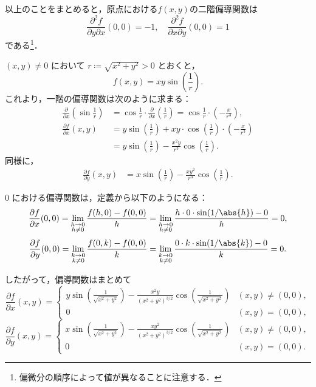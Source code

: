 \begin{tanswer}
以上のことをまとめると，原点における$f(x,y)$の二階偏導関数は
\[
\frac{\partial^2 f}{\partial y \partial x}(0,0) = -1  ,\quad    \frac{\partial^2 f}{\partial x \partial y}(0,0)=1
\]
である\footnote{偏微分の順序によって値が異なることに注意する．}．
\end{tanswer}


\begin{tanswer}
$(x,y) \ne 0$ において $r \coloneqq \sqrt{x^2+y^2}>0$ とおくと，
\[
f(x,y)=xy \sin \left(\frac{1}{r}\right).
\]
これより，一階の偏導関数は次のように求まる：
\begin{align*}
\frac{\partial}{\partial x}\left(\sin\frac{1}{r}\right)
&= \cos\frac{1}{r}\cdot\frac{\partial}{\partial x}\left(\frac{1}{r}\right)
= \cos\frac{1}{r}\cdot\left(-\frac{x}{r^3}\right),\\
\frac{\partial f}{\partial x}(x,y)
&= y\sin \left( \frac{1}{r} \right) + xy \cdot \cos \left( \frac{1}{r} \right) \cdot \left(-\frac{x}{r^3}\right)\\
&= y\sin \left( \frac{1}{r} \right) - \frac{x^2y}{r^3} \cos \left(\frac{1}{r}\right).
\end{align*}
同様に，
\begin{align*}
\frac{\partial f}{\partial y}(x,y)
&= x\sin \left( \frac{1}{r} \right) - \frac{xy^2}{r^3}\cos \left( \frac{1}{r} \right).
\end{align*}

$0$ における偏導関数は，定義から以下のようになる：
\[
\frac{\partial f}{\partial x}(0,0) = \lim_{\substack{h \to 0\\ h \ne 0}}\frac{f(h,0)-f(0,0)}{h} = \lim_{\substack{h \to 0\\ h \ne 0}}\frac{h \cdot 0\cdot\sin(1/\abs{h})-0}{h}=0,
\]
\[
\frac{\partial f}{\partial y}(0,0) = \lim_{\substack{k \to 0\\ k \ne 0}}\frac{f(0,k)-f(0,0)}{k} = \lim_{\substack{k \to 0\\ k \ne 0}}\frac{0\cdot k\cdot\sin(1/\abs{k})-0}{k}=0.
\]

したがって，偏導関数はまとめて
\[
\frac{\partial f}{\partial x}(x,y)=
\begin{cases}
y \sin \left( \frac{1}{\sqrt{x^2+y^2}} \right)-\frac{x^2y}{(x^2+y^2)^{3/2}} \cos \left(\frac{1}{\sqrt{x^2+y^2}}\right)
& (x,y)\ne(0,0),\\
0&(x,y)=(0,0),
\end{cases}
\]
\[
\frac{\partial f}{\partial y}(x,y)=
\begin{cases}
x\sin \left( \frac{1}{\sqrt{x^2+y^2}}\right)-\frac{xy^2}{(x^2+y^2)^{3/2}}\cos \left(\frac{1}{\sqrt{x^2+y^2}}\right)
& (x,y)\ne(0,0),\\
0 & (x,y)=(0,0).
\end{cases}
\]


\end{tanswer}
